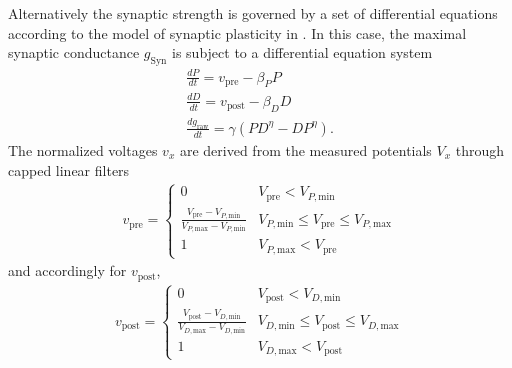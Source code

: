 \documentclass{article}
\begin{document}
Alternatively the synaptic strength is governed by a set of differential
equations according to the model of synaptic plasticity in
\cite{Abarbanel2002}. In this case, the maximal synaptic conductance
$g_{\text{Syn}}$ is subject to a differential equation system
\begin{align}
\frac{dP}{dt} = v_{\text{pre}} - \beta_P P \\
\frac{dD}{dt} = v_{\text{post}} - \beta_D D \\
\frac{dg_{\text{raw}}}{dt} = \gamma (P D^\eta - D P^\eta).
\end{align}
The normalized voltages $v_x$ are derived from the measured potentials
$V_x$ through capped linear filters
\begin{align}
v_{\text{pre}} = \left\{ \begin{array}{ll}
0 & V_{\text{pre}} < V_{P,\text{min}} \\
\frac{V_{\text{pre}}-V_{P, \text{min}}}{V_{P, \text{max}}-V_{P,
    \text{min}}} & V_{P, \text{min}}\leq V_{\text{pre}} \leq V_{P,
  \text{max}} \\
1 & V_{P, \text{max}} < V_{\text{pre}} 
\end{array} \right.
\end{align}
and accordingly for $v_{\text{post}}$,
\begin{align}
v_{\text{post}} = \left\{ \begin{array}{ll}
0 & V_{\text{post}} < V_{D,\text{min}} \\
\frac{V_{\text{post}}-V_{D, \text{min}}}{V_{D, \text{max}}-V_{D,
    \text{min}}} & V_{D, \text{min}}\leq V_{\text{post}} \leq V_{D,
  \text{max}} \\
1 & V_{D, \text{max}} < V_{\text{post}} 
\end{array} \right.
\end{align}
\vspace*{0.3cm}
\end{document}
